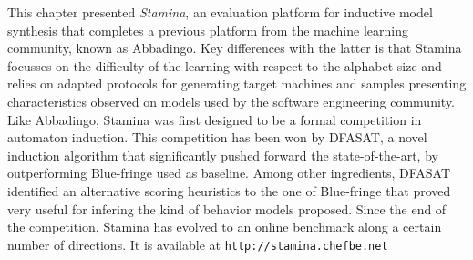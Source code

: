 This chapter presented \emph{Stamina}, an evaluation platform for inductive model synthesis that completes a previous platform from the machine learning community, known as Abbadingo. Key differences with the latter is that Stamina focusses on the difficulty of the learning with respect to the alphabet size and relies on adapted protocols for generating target machines and samples presenting characteristics observed on models used by the software engineering community. Like Abbadingo, Stamina was first designed to be a formal competition in automaton induction. This competition has been won by DFASAT, a novel induction algorithm that significantly pushed forward the state-of-the-art, by outperforming Blue-fringe used as baseline. Among other ingredients, DFASAT identified an alternative scoring heuristics to the one of Blue-fringe that proved very useful for infering the kind of behavior models proposed. Since the end of the competition, Stamina has evolved to an online benchmark along a certain number of directions. It is available at \verb|http://stamina.chefbe.net|

